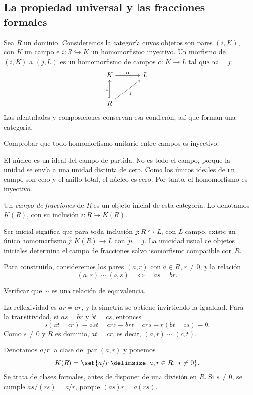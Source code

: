 \subsection{La propiedad universal y las fracciones formales}\label{tema:18-1-1}
Sea $R$ un dominio. Consideremos la categoría cuyos objetos son pares $(i,K)$, con $K$ un campo e $i:R\hookrightarrow K$ un homomorfismo inyectivo. Un morfismo de $(i,K)$ a $(j,L)$ es un homomorfismo de campos $\alpha:K\to L$ tal que $\alpha i=j$:
\[
\begin{tikzcd}[column sep=large,row sep=large]
K\arrow[r,"\alpha"]&L\\
R\arrow[u,hook,"i"]\arrow[ur,hook,"j"']&
\end{tikzcd}
\]
Las identidades y composiciones conservan esa condición, así que forman una categoría.

\begin{ejer}\label{ejer:C18-morfismo-campos}
Comprobar que todo homomorfismo unitario entre campos es inyectivo.
\end{ejer}
\begin{sol}
El núcleo es un ideal del campo de partida. No es todo el campo, porque la unidad se envía a una unidad distinta de cero. Como los únicos ideales de un campo son cero y el anillo total, el núcleo es cero. Por tanto, el homomorfismo es inyectivo.
\end{sol}

\begin{defi}
Un \emph{campo de fracciones} de $R$ es un objeto inicial de esta categoría. Lo denotamos $K(R)$, con su inclusión $i:R\hookrightarrow K(R)$.
\end{defi}
Ser inicial significa que para toda inclusión $j:R\hookrightarrow L$, con $L$ campo, existe un único homomorfismo $\widehat j:K(R)\to L$ con $\widehat ji=j$. La unicidad usual de objetos iniciales determina el campo de fracciones salvo isomorfismo compatible con $R$.

Para construirlo, consideremos los pares $(a,r)$ con $a\in R$, $r\ne0$, y la relación
\[
(a,r)\sim(b,s)\quad\Longleftrightarrow\quad as=br.
\]
\begin{ejer}\label{ejer:C18-equivalencia}
Verificar que $\sim$ es una relación de equivalencia.
\end{ejer}
\begin{sol}
La reflexividad es $ar=ar$, y la simetría se obtiene invirtiendo la igualdad. Para la transitividad, si $as=br$ y $bt=cs$, entonces
\[
s(at-cr)=ast-crs=brt-crs=r(bt-cs)=0.
\]
Como $s\ne0$ y $R$ es dominio, $at=cr$, es decir, $(a,r)\sim(c,t)$.
\end{sol}
Denotamos $a/r$ la clase del par $(a,r)$ y ponemos
\[
K(R)=\set{a/r\given a,r\in R,\ r\ne0}.
\]
Se trata de clases formales, antes de disponer de una división en $R$. Si $s\ne0$, se cumple $as/(rs)=a/r$, porque $(as)r=a(rs)$.


